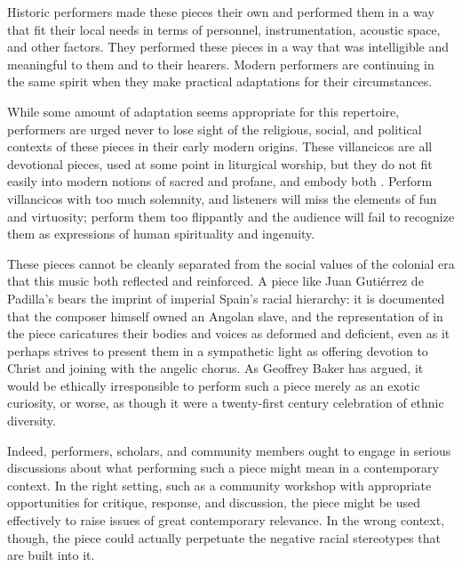Historic performers made these pieces their own and performed them in a way
that fit their local needs in terms of personnel, instrumentation, acoustic
space, and other factors.
They performed these pieces in a way that was intelligible and meaningful to
them and to their hearers.
Modern performers are continuing in the same spirit when they make practical
adaptations for their circumstances.

While some amount of adaptation seems appropriate for this repertoire,
performers are urged never to lose sight of the religious, social, and political
contexts of these pieces in their early modern origins.
These villancicos are all devotional pieces, used at some point in liturgical
worship, but they do not fit easily into modern notions of sacred and profane,
and embody both .%
    \Autocite{Cashner:Cards}
Perform villancicos with too much solemnity, and listeners will miss the
elements of fun and virtuosity;
perform them too flippantly and the audience will fail to recognize them as
expressions of human spirituality and ingenuity.

These pieces cannot be cleanly separated from the social values of the colonial
era that this music both reflected and reinforced.
A piece like Juan Gutiérrez de Padilla's 
bears the imprint of imperial Spain's racial hierarchy: it is documented that
the composer himself owned an Angolan slave,%
    \Autocite{Mauleon:PadillaCivil}
and the representation of  in the piece caricatures their
bodies and voices as deformed and deficient, even as it perhaps strives to
present them in a sympathetic light as offering devotion to Christ and joining
with the angelic chorus.
As Geoffrey Baker has argued, it would be ethically irresponsible to perform
such a piece merely as an exotic curiosity, or worse, as though it were a
twenty-first century celebration of ethnic diversity.%
    \Autocite{Baker:PerformancePostColonial}

Indeed, performers, scholars, and community members ought to engage in serious
discussions about what performing such a piece might mean in a contemporary
context.  
In the right setting, such as a community workshop with appropriate
opportunities for critique, response, and discussion, the piece might be used 
effectively to raise issues of great contemporary relevance.
In the wrong context, though, the piece could actually perpetuate the negative
racial stereotypes that are built into it.




